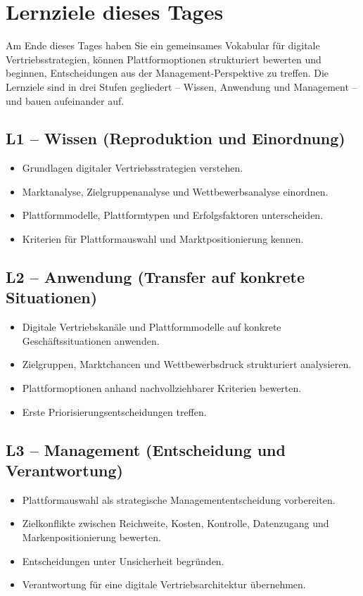 \documentclass[11pt,a4paper,oneside]{article}
\begin{document}
\section*{Lernziele dieses Tages}
\thispagestyle{plain}

\noindent Am Ende dieses Tages haben Sie ein gemeinsames Vokabular für digitale Vertriebsstrategien, können Plattformoptionen strukturiert bewerten und beginnen, Entscheidungen aus der Management-Perspektive zu treffen. Die Lernziele sind in drei Stufen gegliedert -- Wissen, Anwendung und Management -- und bauen aufeinander auf.

\subsection*{L1 -- Wissen (Reproduktion und Einordnung)}
\begin{itemize}
  \item Grundlagen digitaler Vertriebsstrategien verstehen.
  \item Marktanalyse, Zielgruppenanalyse und Wettbewerbsanalyse einordnen.
  \item Plattformmodelle, Plattformtypen und Erfolgsfaktoren unterscheiden.
  \item Kriterien für Plattformauswahl und Marktpositionierung kennen.
\end{itemize}

\subsection*{L2 -- Anwendung (Transfer auf konkrete Situationen)}
\begin{itemize}
  \item Digitale Vertriebskanäle und Plattformmodelle auf konkrete Geschäftssituationen anwenden.
  \item Zielgruppen, Marktchancen und Wettbewerbsdruck strukturiert analysieren.
  \item Plattformoptionen anhand nachvollziehbarer Kriterien bewerten.
  \item Erste Priorisierungsentscheidungen treffen.
\end{itemize}

\subsection*{L3 -- Management (Entscheidung und Verantwortung)}
\begin{itemize}
  \item Plattformauswahl als strategische Managemententscheidung vorbereiten.
  \item Zielkonflikte zwischen Reichweite, Kosten, Kontrolle, Datenzugang und Markenpositionierung bewerten.
  \item Entscheidungen unter Unsicherheit begründen.
  \item Verantwortung für eine digitale Vertriebsarchitektur übernehmen.
\end{itemize}
\end{document}
